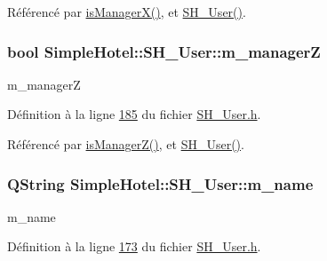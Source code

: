 Référencé par \hyperlink{classSimpleHotel_1_1SH__User_a98ea0f274591c094f62063c5d03c313f}{is\-Manager\-X()}, et \hyperlink{classSimpleHotel_1_1SH__User_a17ba6e42386d48d6463cfceb92c1640c}{S\-H\-\_\-\-User()}.

\hypertarget{classSimpleHotel_1_1SH__User_ab051b175496577f7e6ad62b7f2a4eb44}{
\subsubsection[{m\-\_\-manager\-Z}]{\setlength{\rightskip}{0pt plus 5cm}bool Simple\-Hotel\-::\-S\-H\-\_\-\-User\-::m\-\_\-manager\-Z\hspace{0.3cm}{\ttfamily [private]}}}\label{classSimpleHotel_1_1SH__User_ab051b175496577f7e6ad62b7f2a4eb44}


m\-\_\-manager\-Z 



Définition à la ligne \hyperlink{SH__User_8h_source_l00185}{185} du fichier \hyperlink{SH__User_8h_source}{S\-H\-\_\-\-User.\-h}.



Référencé par \hyperlink{classSimpleHotel_1_1SH__User_a0f69fcf69b750b59aef25f95e44fd789}{is\-Manager\-Z()}, et \hyperlink{classSimpleHotel_1_1SH__User_a17ba6e42386d48d6463cfceb92c1640c}{S\-H\-\_\-\-User()}.

\hypertarget{classSimpleHotel_1_1SH__User_a5612336f4b4aa4c4557c401baf87cc7f}{
\subsubsection[{m\-\_\-name}]{\setlength{\rightskip}{0pt plus 5cm}Q\-String Simple\-Hotel\-::\-S\-H\-\_\-\-User\-::m\-\_\-name\hspace{0.3cm}{\ttfamily [private]}}}\label{classSimpleHotel_1_1SH__User_a5612336f4b4aa4c4557c401baf87cc7f}


m\-\_\-name 



Définition à la ligne \hyperlink{SH__User_8h_source_l00173}{173} du fichier \hyperlink{SH__User_8h_source}{S\-H\-\_\-\-User.\-h}.



